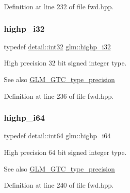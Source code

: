 Definition at line 232 of file fwd.\+hpp.

\mbox{\label{group__gtc__type__precision_ga197d19b585222da57d70238a5cfc2be8}} 
\subsubsection{\texorpdfstring{highp\_i32}{highp\_i32}}
{\footnotesize\ttfamily typedef \mbox{\hyperlink{namespaceglm_1_1detail_a9f85b4efeca416cdcec2fd08939a2e17}{detail\+::int32}} \mbox{\hyperlink{group__gtc__type__precision_ga197d19b585222da57d70238a5cfc2be8}{glm\+::highp\+\_\+i32}}}

High precision 32 bit signed integer type. \begin{DoxySeeAlso}{See also}
\mbox{\hyperlink{group__gtc__type__precision}{G\+L\+M\+\_\+\+G\+T\+C\+\_\+type\+\_\+precision}} 
\end{DoxySeeAlso}


Definition at line 236 of file fwd.\+hpp.

\mbox{\label{group__gtc__type__precision_gad3cb9a0ac0266ea2c51c6fac256345d1}} 
\subsubsection{\texorpdfstring{highp\_i64}{highp\_i64}}
{\footnotesize\ttfamily typedef \mbox{\hyperlink{namespaceglm_1_1detail_a5b1c3227ec636c24a0676746381adfc8}{detail\+::int64}} \mbox{\hyperlink{group__gtc__type__precision_gad3cb9a0ac0266ea2c51c6fac256345d1}{glm\+::highp\+\_\+i64}}}

High precision 64 bit signed integer type. \begin{DoxySeeAlso}{See also}
\mbox{\hyperlink{group__gtc__type__precision}{G\+L\+M\+\_\+\+G\+T\+C\+\_\+type\+\_\+precision}} 
\end{DoxySeeAlso}


Definition at line 240 of file fwd.\+hpp.

\mbox{\label{group__gtc__type__precision_ga8b9eb0b24cce7f14478bfcacb53ce839}} 
